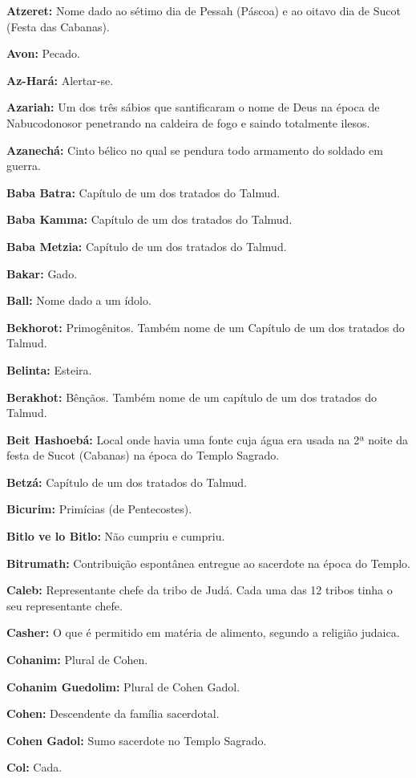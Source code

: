 \begin{hangparas}{.25in}{1}
{\textbf{Atzeret:} Nome dado ao sétimo dia de Pessah (Páscoa) e ao
oitavo dia de Sucot (Festa das Cabanas).

\textbf{Avon:} Pecado.

\textbf{Az-Hará:} Alertar-se.

\textbf{Azariah:} Um dos três sábios que santificaram o nome de Deus na
época de Nabucodonosor penetrando na caldeira de fogo e saindo
totalmente ilesos.

\textbf{Azanechá:} Cinto bélico no qual se pendura todo armamento do
soldado em guerra.

\textbf{Baba Batra:} Capítulo de um dos tratados do Talmud.

\textbf{Baba Kamma:} Capítulo de um dos tratados do Talmud.

\textbf{Baba Metzia:} Capítulo de um dos tratados do Talmud.

\textbf{Bakar:} Gado.

\textbf{Ball:} Nome dado a um ídolo.

\textbf{Bekhorot:} Primogênitos. Também nome de um Capítulo de um dos
tratados do Talmud.

\textbf{Belinta:} Esteira.

\textbf{Berakhot:} Bênçãos. Também nome de um capítulo de um dos
tratados do Talmud.

\textbf{Beit Hashoebá:} Local onde havia uma fonte cuja água era usada
na 2ª noite da festa de Sucot (Cabanas) na época do Templo Sagrado.

\textbf{Betzá:} Capítulo de um dos tratados do Talmud.

\textbf{Bicurim:} Primícias (de Pentecostes).

\textbf{Bitlo ve lo Bitlo:} Não cumpriu e cumpriu.

\textbf{Bitrumath:} Contribuição espontânea entregue ao sacerdote na
época do Templo.

\textbf{Caleb:} Representante chefe da tribo de Judá. Cada uma das 12
tribos tinha o seu representante chefe.

\textbf{Casher:} O que é permitido em matéria de alimento, segundo a
religião judaica.

\textbf{Cohanim:} Plural de Cohen.

\textbf{Cohanim Guedolim:} Plural de Cohen Gadol.

\textbf{Cohen:} Descendente da família sacerdotal.

\textbf{Cohen Gadol:} Sumo sacerdote no Templo Sagrado.

\textbf{Col:} Cada.

}
\end{hangparas}
